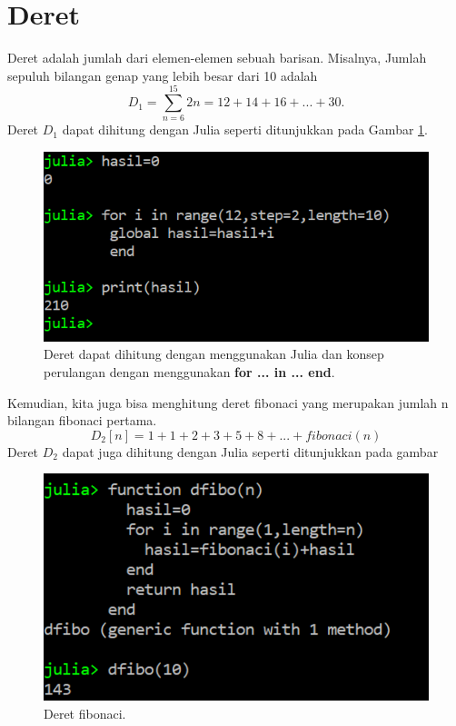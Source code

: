 \documentclass[12pt,a4paper]{memoir}
\begin{document}
\section{Deret}
Deret adalah jumlah dari elemen-elemen sebuah barisan. Misalnya, Jumlah sepuluh bilangan genap yang lebih besar dari 10 adalah
\begin{equation*}
D_1=\sum_{n=6}^{15} 2n=12+14+16+...+30.
\end{equation*}
Deret $D_1$ dapat dihitung dengan Julia seperti ditunjukkan pada Gambar \ref{fig:deret1}.

\begin{figure}
	\centering
	\includegraphics{images/deret1}
	\caption{Deret dapat dihitung dengan menggunakan Julia dan konsep perulangan dengan menggunakan \textbf{for ... in ... end}.}
	\label{fig:deret1}
\end{figure}
Kemudian, kita juga bisa menghitung deret fibonaci yang merupakan jumlah n bilangan fibonaci pertama.
\begin{equation*}
D_2[n]=1+1+2+3+5+8+...+fibonaci(n)
\end{equation*}
Deret $D_2$ dapat juga dihitung dengan Julia seperti ditunjukkan pada gambar 

\begin{figure}
	\centering
	\includegraphics{images/deretfibo}
	\caption{Deret fibonaci.}
	\label{fig:deretfibo}
\end{figure}
\end{document}
